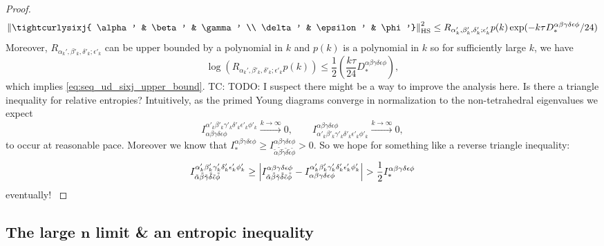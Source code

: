 \documentclass[notitlepage, 10pt]{article}
\begin{document}
\begin{proof}
\begin{equation}
        \norm{\tightcurlysixj{ \alpha' & \beta' & \gamma' \\ \delta' &  \epsilon' &  \phi'}}_{\mathrm{HS}}^2 
        \leq R_{\alpha_k',\beta'_k,\delta'_k;\epsilon'_k} p(k) \exp(-k\tau D_{*}^{\alpha\beta\gamma\delta\epsilon\phi}/24)
    \end{equation}
    Moreover, $R_{\alpha_k',\beta'_k,\delta'_k;\epsilon'_k}$ can be upper bounded by a polynomial in $k$ and $p(k)$ is a polynomial in $k$ so for sufficiently large $k$, we have 
    \begin{equation}
        \log(R_{\alpha_k',\beta'_k,\delta'_k;\epsilon'_k} p(k)) \leq \frac{1}{2}\left(\frac{k\tau}{24} D_{*}^{\alpha\beta\gamma\delta\epsilon\phi}\right),
    \end{equation}
    which implies \cref{eq:seq_ud_sixj_upper_bound}.
{\color{blue}
        TC: TODO:
        I suspect there might be a way to improve the analysis here.
        Is there a triangle inequality for relative entropies? 
        Intuitively, as the primed Young diagrams converge in normalization to the non-tetrahedral eigenvalues we expect
        \begin{equation}
            I_{\alpha\beta\gamma\delta\epsilon\phi}^{\alpha'_k\beta'_k\gamma'_k\delta'_k\epsilon'_k\phi'_k} \stackrel{k\to\infty}{\rightarrow} 0,
            \qquad
            I^{\alpha\beta\gamma\delta\epsilon\phi}_{\alpha'_k\beta'_k\gamma'_k\delta'_k\epsilon'_k\phi'_k} \stackrel{k\to\infty}{\rightarrow} 0,
        \end{equation}
        to occur at reasonable pace.
        Moreover we know that $I_{*}^{\alpha\beta\gamma\delta\epsilon\phi} \geq I_{\tilde \alpha\tilde \beta\tilde \gamma\tilde \delta\tilde \epsilon\tilde \phi}^{\alpha\beta\gamma\delta\epsilon\phi} > 0$.
        So we hope for something like a reverse triangle inequality:
        \begin{equation}
            I^{\alpha'_k\beta'_k\gamma'_k\delta'_k\epsilon'_k\phi'_k}_{\tilde \alpha \tilde \beta\tilde \gamma\tilde \delta\tilde \epsilon\tilde \phi} \geq \left|I_{\tilde \alpha\tilde \beta\tilde \gamma\tilde \delta\tilde \epsilon\tilde \phi}^{\alpha\beta\gamma\delta\epsilon\phi} - I_{\alpha\beta\gamma\delta\epsilon\phi}^{\alpha'_k\beta'_k\gamma'_k\delta'_k\epsilon'_k\phi'_k}\right| > \frac{1}{2}I_{*}^{\alpha\beta\gamma\delta\epsilon\phi}
         \end{equation}
         eventually!
    }
\end{proof}

\subsection{The large \texorpdfstring{$\boldsymbol{n}$}{n} limit \& an entropic inequality}
\end{document}
